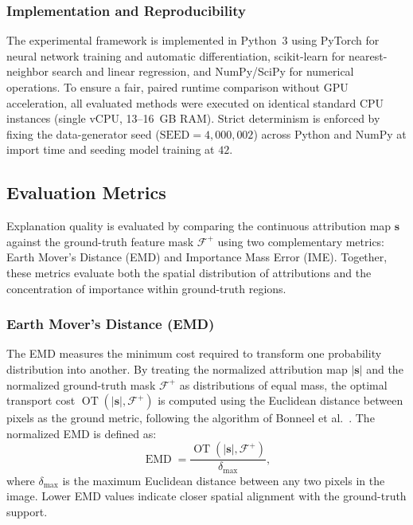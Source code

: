 \documentclass[pdflatex,sn-mathphys-num]{sn-jnl}
\theoremstyle{thmstyleone}
\theoremstyle{thmstyletwo}%
\theoremstyle{thmstylethree}%
\begin{document}
\subsubsection{Implementation and Reproducibility}\label{sec:repro}
The experimental framework is implemented in Python~3 using PyTorch for neural network training and automatic differentiation, scikit-learn for nearest-neighbor search and linear regression, and NumPy/SciPy for numerical operations. To ensure a fair, paired runtime comparison without GPU acceleration, all evaluated methods were executed on identical standard CPU instances (single vCPU, 13--16~GB RAM). Strict determinism is enforced by fixing the data-generator seed ($\mathrm{SEED} = 4{,}000{,}002$) across Python and NumPy at import time and seeding model training at $42$.

\subsection{Evaluation Metrics}\label{sec:eval_metrics}
Explanation quality is evaluated by comparing the continuous attribution map $\mathbf{s}$ against the ground-truth feature mask $\mathcal{F}^+$ using two complementary metrics: Earth Mover's Distance (EMD) and Importance Mass Error (IME). Together, these metrics evaluate both the spatial distribution of attributions and the concentration of importance within ground-truth regions.

\subsubsection{Earth Mover's Distance (EMD)}
The EMD measures the minimum cost required to transform one probability distribution into another. By treating the normalized attribution map $|\mathbf{s}|$ and the normalized ground-truth mask $\mathcal{F}^+$ as distributions of equal mass, the optimal transport cost $\operatorname{OT}(|\mathbf{s}|, \mathcal{F}^+)$ is computed using the Euclidean distance between pixels as the ground metric, following the algorithm of Bonneel et al.~\cite{bonneel2011}. The normalized EMD is defined as:
\begin{equation}
    \operatorname{EMD} = \frac{\operatorname{OT}(|\mathbf{s}|, \mathcal{F}^+)}{\delta_{\max}},
\end{equation}
where $\delta_{\max}$ is the maximum Euclidean distance between any two pixels in the image. Lower EMD values indicate closer spatial alignment with the ground-truth support.
\end{document}
